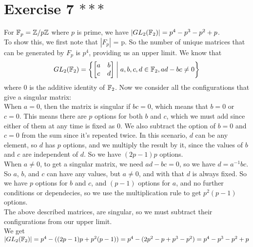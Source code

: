 \documentclass[12pt]{article}
\begin{document}
    \section*{Exercise 7 $***$}
    For $\mathbb{F}_p = \mathbb{Z}/p\mathbb{Z}$ where $p$ is prime,
    we have $|GL_2(\mathbb{F}_2)| = p^4 - p^3 - p^2 + p$. \\
    To show this, we first note that $|F_p|$ = p. 
    So the number of unique matrices that can be generated by $F_p$
    is $p^4$, providing us an upper limit.
    We know that
    \[ GL_2(\mathbb{F}_2) = \left\{
        \begin{bmatrix}
            a & b \\
            c & d \\
        \end{bmatrix} 
        \; \middle\vert \;
        a, b, c, d \in \mathbb{F}_2,
        ad - bc \neq 0  
    \right\} \] 
    where 0 is the additive identity of $\mathbb{F}_2$.
    Now we consider all the configurations that give a singular matrix: \\
    When $a = 0$,
    then the matrix is singular if $bc = 0$,
    which means that $b = 0$ or $c = 0$.
    This means there are $p$ options for both $b$ and $c$,
    which we must add since either of them at any time is fixed as 0.
    We also subtract the option of $b = 0$ and $c = 0$ from the sum
    since it's repeated twice.
    In this scenario, $d$ can be any element,
    so $d$ has $p$ options,
    and we multiply the result by it,
    since the values of $b$ and $c$ are independent of $d$.
    So we have $(2p - 1)p$ options. \\
    When $a \neq 0$,
    to get a singular matrix, we need $ad - bc = 0$,
    so we have $d = a^{-1}bc$.
    So $a$, $b$, and $c$ can have any values,
    but $a \neq 0$,
    and with that $d$ is always fixed.
    So we have $p$ options for $b$ and $c$,
    and $(p-1)$ options for $a$,
    and no further conditions or dependecies,
    so we use the multiplication rule to get $p^2(p-1)$ options. \\
    The above described matrices, are singular,
    so we must subtract their configurations from our upper limit. \\
    We get $|GL_2(\mathbb{F}_2)| = p^4 - ((2p - 1)p + p^2(p-1))
    = p^4 - (2p^2 - p + p^3 - p^2)
    = p^4 - p^3 - p^2 + p$
\end{document}
